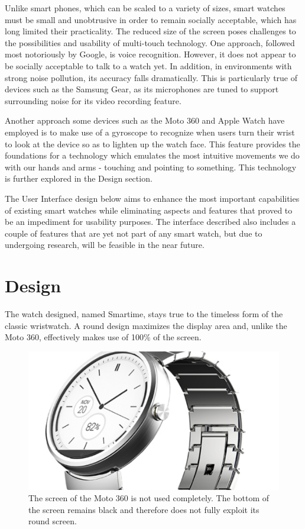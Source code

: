 \documentclass{article}
\begin{document}
Unlike smart phones, which can be scaled to a variety of sizes, smart watches must be small and unobtrusive in order to remain socially acceptable, which has long limited their practicality. The reduced size of the screen poses challenges to the possibilities and usability of multi-touch technology. One approach, followed most notoriously by Google, is voice recognition.  However, it does not appear to be socially acceptable to talk to a watch yet. In addition, in environments with strong noise pollution, its accuracy falls dramatically. This is particularly true of devices such as the Samsung Gear, as its microphones are tuned to support surrounding noise for its video recording feature.

Another approach some devices such as the Moto 360 and Apple Watch have employed is to make use of a gyroscope to recognize when users turn their wrist to look at the device so as to lighten up the watch face. This feature provides the foundations for a technology which emulates the most intuitive movements we do with our hands and arms - touching and pointing to something. This technology is further explored in the Design section.

The User Interface design below aims to enhance the most important capabilities of existing smart watches while eliminating aspects and features that proved to be an impediment for usability purposes. The interface described also includes a couple of features that are yet not part of any smart watch, but due to undergoing research, will be feasible in the near future. 


\section{Design}
The watch designed, named Smartime, stays true to the timeless form of the classic wristwatch. A round design maximizes the display area and, unlike the Moto 360, effectively makes use of 100\% of the screen.

\begin{figure}[h]
\centering
\includegraphics[width=3 in]{moto360_screen.jpg}
\caption{The screen of the Moto 360 is not used completely. The bottom of the screen remains black and therefore does not fully exploit its round screen. }
\end{figure}
\end{document}
